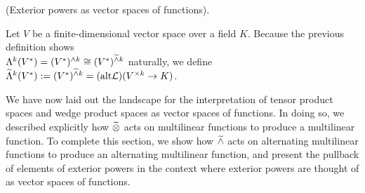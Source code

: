 \begin{defn}
    (Exterior powers as vector spaces of functions).
    
    Let $V$ be a finite-dimensional vector space over a field $K$. Because the previous definition shows \\ ${\Lambda^k(V^*) = (V^*)^{\wedge k} \cong (V^*)^{\widetilde{\wedge} k}}$ naturally, we define $\widetilde{\Lambda}^k(V^*) := (V^*)^{\widetilde{\wedge} k} = (\text{alt} \mathcal{L})(V^{\times k} \rightarrow K)$.
\end{defn}

    
    

We have now laid out the landscape for the interpretation of tensor product spaces and wedge product spaces as vector spaces of functions. In doing so, we described explicitly how $\widetilde{\otimes}$ acts on multilinear functions to produce a multilinear function. To complete this section, we show how $\widetilde{\wedge}$ acts on alternating multilinear functions to produce an alternating multilinear function, and present the pullback of elements of exterior powers in the context where exterior powers are thought of as vector spaces of functions.

